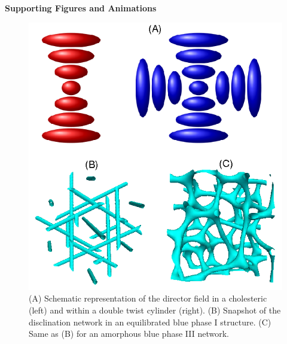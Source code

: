\documentclass[12pt,twoside]{article}
\begin{document}
\vfill\pagebreak


{\bf Supporting Figures and Animations}

\begin{figure}[!h]
\begin{center}
\includegraphics[scale=0.8]{support-fig1.png}
\end{center}
\caption{
(A) Schematic representation of the director field
in a cholesteric (left) and within a double twist cylinder (right).
(B) Snapshot of the disclination network in an equilibrated 
blue phase I structure. (C) Same as (B) for an amorphous blue phase III
network.}
\end{figure}

\newpage
\end{document}
